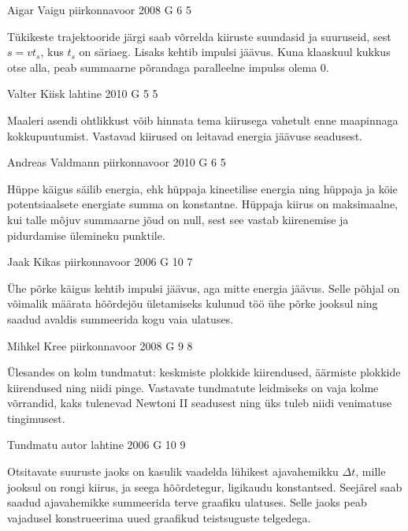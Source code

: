 \documentclass[11pt, twoside]{article}
\begin{document}
{%
{Aigar Vaigu} %
{piirkonnavoor} %
{2008} %
{G 6} %
{5} %
{

\ifHint
Tükikeste trajektooride järgi saab võrrelda kiiruste suundasid ja suuruseid, sest $s = vt_s$, kus $t_s$ on säriaeg. Lisaks kehtib impulsi jäävus. Kuna klaaskuul kukkus otse alla, peab summaarne põrandaga paralleelne impulss olema 0.
\fi
}

{Valter Kiisk} %
{lahtine} %
{2010} %
{G 5} %
{5} %
{

\ifHint
Maaleri asendi ohtlikkust võib hinnata tema kiirusega vahetult enne maapinnaga kokkupuutumist. Vastavad kiirused on leitavad energia jäävuse seadusest.
\fi
}

{Andreas Valdmann} %
{piirkonnavoor} %
{2010} %
{G 6} %
{5} %
{

\ifHint
Hüppe käigus säilib energia, ehk hüppaja kineetilise energia ning hüppaja ja köie potentsiaalsete energiate summa on konstantne. Hüppaja kiirus on maksimaalne, kui talle mõjuv summaarne jõud on null, sest see vastab kiirenemise ja pidurdamise ülemineku punktile.
\fi
}

{Jaak Kikas} %
{piirkonnavoor} %
{2006} %
{G 10} %
{7} %
{

\ifHint
Ühe põrke käigus kehtib impulsi jäävus, aga mitte energia jäävus. Selle põhjal on võimalik määrata hõõrdejõu ületamiseks kulunud töö ühe põrke jooksul ning saadud avaldis summeerida kogu vaia ulatuses.
\fi
}

{Mihkel Kree} %
{piirkonnavoor} %
{2008} %
{G 9} %
{8} %
{

\ifHint
Ülesandes on kolm tundmatut: keskmiste plokkide kiirendused, äärmiste plokkide kiirendused ning niidi pinge. Vastavate tundmatute leidmiseks on vaja kolme võrrandid, kaks tulenevad Newtoni II seadusest ning üks tuleb niidi venimatuse tingimusest.
\fi
}

{Tundmatu autor} %
{lahtine} %
{2006} %
{G 10} %
{9} %
{

\ifHint
Otsitavate suuruste jaoks on kasulik vaadelda lühikest ajavahemikku $\Delta t$, mille jooksul on rongi kiirus, ja seega hõõrdetegur, ligikaudu konstantsed. Seejärel saab saadud ajavahemikke summeerida terve graafiku ulatuses. Selle jaoks peab vajadusel konstrueerima uued graafikud teistsuguste telgedega.
\fi
}

}
\end{document}

